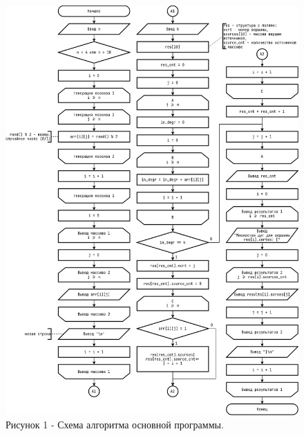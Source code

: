\documentclass[oneside,a4paper,14pt]{extarticle}
\begin{document}
\clearpage
\begin{figure}[H]
	\centering
	\includegraphics[height=0.9\textheight]{pics/flowchart.png}
	\caption*{Рисунок 1 - Схема алгоритма основной программы.}
\end{figure}
\end{document}
